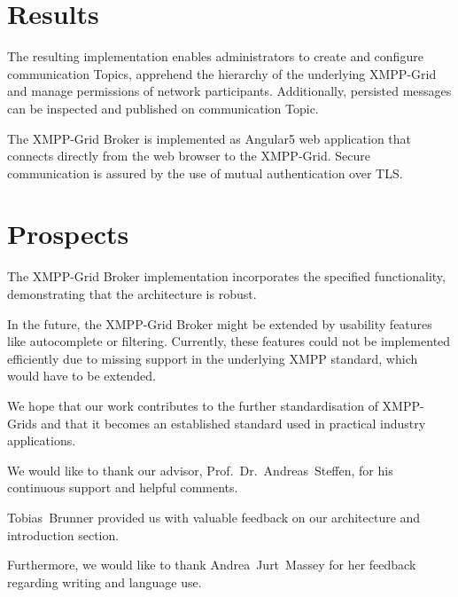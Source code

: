 \section*{Results}

The resulting implementation enables administrators to create and configure communication Topics, apprehend the hierarchy of the underlying XMPP-Grid and manage permissions of network participants.
Additionally, persisted messages can be inspected and published on communication Topic.

The XMPP-Grid Broker is implemented as Angular5 web application that connects directly from the web browser to the XMPP-Grid. Secure communication is assured by the use of mutual authentication over TLS.

\section*{Prospects}

The XMPP-Grid Broker implementation incorporates the specified functionality, demonstrating that the architecture is robust.

In the future, the XMPP-Grid Broker might be extended by usability features like autocomplete or filtering. Currently, these features could not be implemented efficiently due to missing support in the underlying XMPP standard, which would have to be extended.

We hope that our work contributes to the further standardisation of XMPP-Grids and that it becomes an established standard used in practical industry applications.


\begin{acknowledgements}
\addchaptertocentry{\acknowledgementname} %
We would like to thank our advisor, Prof.~Dr.~Andreas~Steffen, for his continuous support and helpful comments.

Tobias~Brunner provided us with valuable feedback on our architecture and introduction section.

Furthermore, we would like to thank Andrea~Jurt~Massey for her feedback regarding writing and language use.
\end{acknowledgements}


